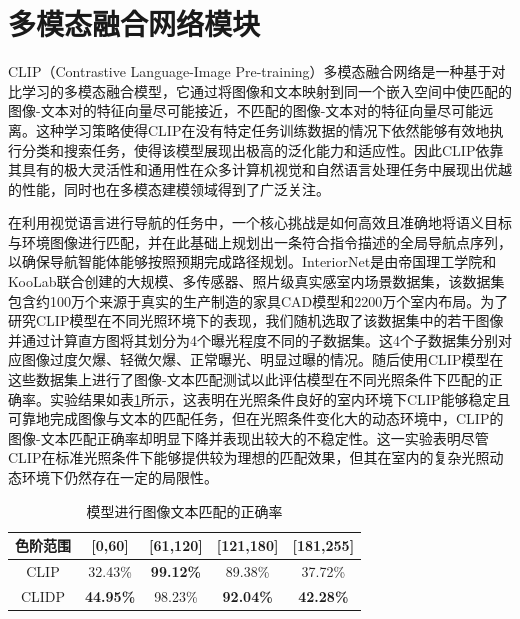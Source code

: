 \section{多模态融合网络模块}
CLIP（Contrastive Language-Image Pre-training）多模态融合网络\cite{radford2021learning}是一种基于对比学习的多模态融合模型，它通过将图像和文本映射到同一个嵌入空间中使匹配的图像-文本对的特征向量尽可能接近，不匹配的图像-文本对的特征向量尽可能远离。这种学习策略使得CLIP在没有特定任务训练数据的情况下依然能够有效地执行分类和搜索任务，使得该模型展现出极高的泛化能力和适应性。因此CLIP依靠其具有的极大灵活性和通用性在众多计算机视觉和自然语言处理任务中展现出优越的性能，同时也在多模态建模领域得到了广泛关注。

在利用视觉语言进行导航的任务中，一个核心挑战是如何高效且准确地将语义目标与环境图像进行匹配，并在此基础上规划出一条符合指令描述的全局导航点序列，以确保导航智能体能够按照预期完成路径规划。InteriorNet\cite{li2018interiornet}是由帝国理工学院和KooLab联合创建的大规模、多传感器、照片级真实感室内场景数据集，该数据集包含约100万个来源于真实的生产制造的家具CAD模型和2200万个室内布局。为了研究CLIP模型在不同光照环境下的表现，我们随机选取了该数据集中的若干图像并通过计算直方图将其划分为4个曝光程度不同的子数据集。这4个子数据集分别对应图像过度欠爆、轻微欠爆、正常曝光、明显过曝的情况。随后使用CLIP模型在这些数据集上进行了图像-文本匹配测试以此评估模型在不同光照条件下匹配的正确率。实验结果如表\ref{Matching_accuracy}所示，这表明在光照条件良好的室内环境下CLIP能够稳定且可靠地完成图像与文本的匹配任务，但在光照条件变化大的动态环境中，CLIP的图像-文本匹配正确率却明显下降并表现出较大的不稳定性。这一实验表明尽管CLIP在标准光照条件下能够提供较为理想的匹配效果，但其在室内的复杂光照动态环境下仍然存在一定的局限性。

\begin{table}[ht]
	\centering
	\caption{模型进行图像文本匹配的正确率} %
	\begin{tabular}{ccccc} %
	\toprule %
	色阶范围 & [0,60] & [61,120] & [121,180] & [181,255]  \\ %
	\midrule %
	CLIP & 32.43\% & \textbf{99.12\%} & 89.38\% & 37.72\% \\ %
	CLIDP & \textbf{44.95\%} & 98.23\% & \textbf{92.04\%} & \textbf{42.28\%} \\ %
	\bottomrule %
	\end{tabular}
	\label{Matching_accuracy}
\end{table}

